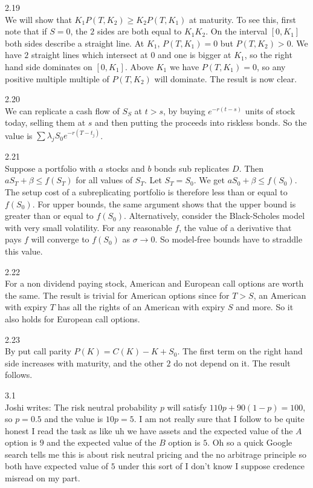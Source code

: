 2.19 \\
We will show that $K_1 P(T,K_2) \ge K_2 P(T,K_1)$ at maturity. To see this, first note that if $S=0$, the $2$ sides are both equal to $K_1 K_2$. On the interval $[0,K_1]$ both sides describe a straight line. At $K_1$, $P(T,K_1)=0$ but $P(T,K_2) > 0$. We have $2$ straight lines which intersect at $0$ and one is bigger at $K_1$, so the right hand side dominates on $[0,K_1]$. Above $K_1$ we have $P(T,K_1)=0$, so any positive multiple multiple of $P(T,K_2)$ will dominate. The result is now clear.

2.20 \\
We can replicate a cash flow of $S_S$ at $t > s$, by buying $e^{-r(t-s)}$ units of stock today, selling them at $s$ and then putting the proceeds into riskless bonds. So the value is $\sum \lambda_j S_0 e^{-r(T-t_j)}$.

2.21 \\
Suppose a portfolio with $a$ stocks and $b$ bonds sub replicates $D$. Then $a S_T + \beta \le f(S_T)$ for all values of $S_T$. Let $S_T=S_0$. We get $a S_0 + \beta \le f(S_0)$. The setup cost of a subreplicating portfolio is therefore less than or equal to $f(S_0)$. For upper bounds, the same argument shows that the upper bound is greater than or equal to $f(S_0)$. Alternatively, consider the Black-Scholes model with very small volatility. For any reasonable $f$, the value of a derivative that pays $f$ will converge to $f(S_0)$ as $\sigma \to 0$. So model-free bounds have to straddle this value.

2.22 \\
For a non dividend paying stock, American and European call options are worth the same. The result is trivial for American options since for $T > S$, an American with expiry $T$ has all the rights of an American with expiry $S$ and more. So it also holds for European call options.

2.23 \\
By put call parity $P(K)=C(K)-K+S_0$. The first term on the right hand side increases with maturity, and the other $2$ do not depend on it. The result follows.

3.1 \\
Joshi writes: The risk neutral probability $p$ will satisfy $110p+90(1-p)=100$, so $p=0.5$ and the value is $10p=5$. I am not really sure that I follow to be quite honest I read the task as like uh we have assets and the expected value of the $A$ option is $9$ and the expected value of the $B$ option is $5$. Oh so a quick Google search tells me this is about risk neutral pricing and the no arbitrage principle so both have expected value of $5$ under this sort of I don't know I suppose credence misread on my part.

